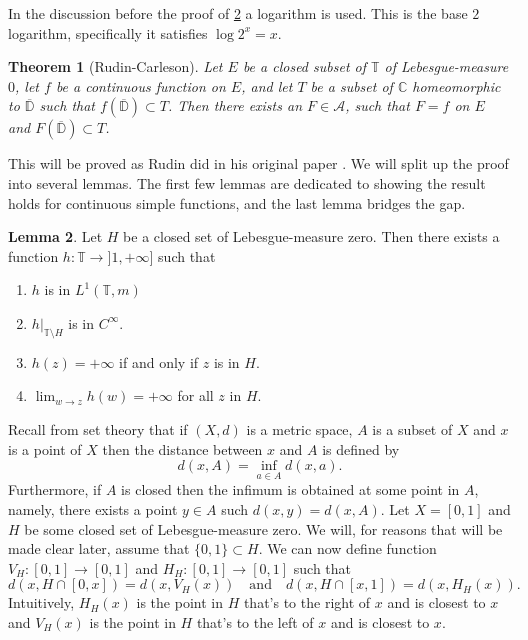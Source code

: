 \documentclass[a4paper,12pt,twoside,BCOR=10mm]{scrbook}
\newtheorem{theorem}{Theorem}[section]
\theoremstyle{definition}
\theoremstyle{definition}
\newtheorem{lemma}[theorem]{Lemma}
\theoremstyle{definition}
\begin{document}
\label{index27}
In the discussion before the proof of \ref{mylemma} a logarithm is used.
This is the base $2$ logarithm, specifically it satisfies $\log 2^x = x$.

\begin{theorem}[Rudin-Carleson]
\label{rudincarleson}
Let $E$ be a closed subset of $\mathbb{T}$ of Lebesgue-measure $0$,
	let $f$ be a continuous function on $E$,
	and let $T$ be a subset of $\mathbb{C}$ homeomorphic to $\overline{\mathbb{D}}$ such that $f(\overline{\mathbb{D}}) \subset T$.
Then there exists an $F \in \mathcal{A}$, such that $F = f$ on $E$ and $F(\overline{\mathbb{D}}) \subset T$.
\end{theorem}
This will be proved as Rudin did in his original paper \citep{rudin}.
We will split up the proof into several lemmas.
The first few lemmas are dedicated to showing the result holds for continuous simple functions, and the last lemma bridges the gap.
\begin{lemma}
\label{mylemma}
Let $H$ be a closed set of Lebesgue-measure zero.
Then there exists a function $h: \mathbb{T} \rightarrow ]1, +\infty]$ such that 
\begin{enumerate}
\item
$h$ is in $L^1(\mathbb{T}, m)$
\item
$h|_{\mathbb{T} \setminus H}$ is in $C^{\infty}$.
\item
$h(z) = +\infty$ if and only if $z$ is in $H$.
\item
$\lim_{w \rightarrow z} h(w) = +\infty$ for all $z$ in $H$.
\end{enumerate}
\end{lemma}
Recall from set theory that if $(X, d)$ is a metric space, $A$ is a subset of $X$ and $x$ is a point of $X$ then the distance between $x$ and $A$ is defined by
\[
	d(x, A) = \inf_{a \in A} d(x, a).
\]
Furthermore, if $A$ is closed then the infimum is obtained at some point in $A$, namely, there exists a point $y \in A$ such $d(x, y) = d(x, A)$.
Let $X = [0, 1]$ and $H$ be some closed set of Lebesgue-measure zero.
We will, for reasons that will be made clear later, assume that $\{0, 1\} \subset H$.
\label{index28}
We can now define function $V_H: [0, 1] \rightarrow [0, 1]$ and $H_H: [0, 1] \rightarrow [0, 1]$ such that
\[
	d(x, H \cap [0, x]) = d(x, V_H(x))
	\quad \text{and} \quad
	d(x, H \cap [x, 1]) = d(x, H_H(x)).
\]
Intuitively, $H_H(x)$ is the point in $H$ that's to the right of $x$ and is closest to $x$ and $V_H(x)$ is the point in $H$ that's to the left of $x$ and is closest to $x$.
\end{document}
